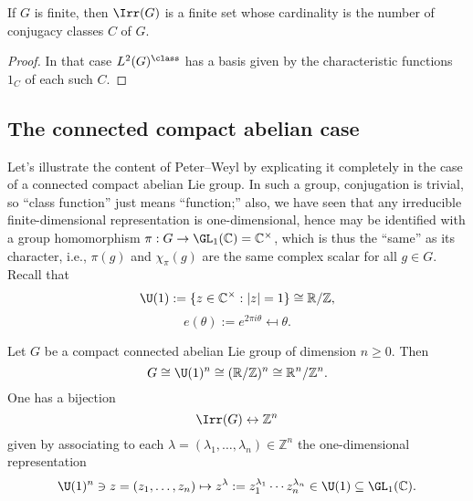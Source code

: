 \documentclass[reqno]{amsart} 
\begin{document}
\begin{corollary}
  If $G$ is finite, then $\Irr(G)$ is a finite set whose cardinality is the number of conjugacy classes $C$ of $G$.
\end{corollary}
\begin{proof}
  In that case $L^2(G)^{\class}$ has a basis given by the characteristic functions $1_C$ of each such $C$.
\end{proof}


\subsection{The connected compact abelian case}\label{sec:conn-comp-abel}
Let's illustrate the content of Peter--Weyl by explicating it completely in the case of a connected compact abelian Lie group.  In such a group, conjugation is trivial, so ``class function'' just means ``function;'' also, we have seen that any irreducible finite-dimensional representation is one-dimensional, hence may be identified with a group homomorphism $\pi : G \rightarrow \GL_1(\mathbb{C}) = \mathbb{C}^\times$, which is thus the ``same'' as its character, i.e., $\pi(g)$ and $\chi_\pi(g)$ are the same complex scalar for all $g \in G$.  Recall that
\begin{equation*}
  \U(1) := \{z \in \mathbb{C}^\times : |z| = 1\} \cong \mathbb{R}/\mathbb{Z},
\end{equation*}
\begin{equation*}
  e(\theta) := e^{2 \pi i \theta} \mapsfrom \theta.
\end{equation*}
\begin{lemma}\label{lem:reps-of-tori}
  Let $G$ be a compact connected abelian Lie group of dimension $n \geq 0$.  Then
  \begin{equation*}
    G \cong \U(1)^n \cong (\mathbb{R}/\mathbb{Z})^n \cong \mathbb{R}^n/\mathbb{Z}^n.
  \end{equation*}
  One has a bijection
  \begin{equation*}
    \Irr(G) \leftrightarrow \mathbb{Z}^n
  \end{equation*}
  given by associating to each $\lambda = (\lambda_1,\dotsc,\lambda_n) \in \mathbb{Z}^n$ the one-dimensional representation
  \begin{equation}\label{eq:defn-char-of-U1-to-the-n}
    \U(1)^n
    \ni z = (z_1,\dotsc,z_n)
    \mapsto z^{\lambda} :=
    z_1^{\lambda_1} \dotsb z_n^{\lambda_n}
    \in \U(1) \subseteq \GL_1(\mathbb{C}).
  \end{equation}
\end{lemma}
\end{document}
